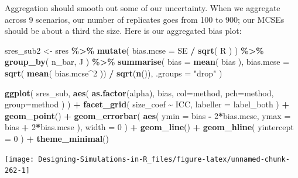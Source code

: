 \documentclass[
]{book}
\newenvironment{Shaded}{\begin{snugshade}}{\end{snugshade}}
\newcommand{\AttributeTok}[1]{\textcolor[rgb]{0.13,0.29,0.53}{#1}}
\newcommand{\DecValTok}[1]{\textcolor[rgb]{0.00,0.00,0.81}{#1}}
\newcommand{\FunctionTok}[1]{\textcolor[rgb]{0.13,0.29,0.53}{\textbf{#1}}}
\newcommand{\NormalTok}[1]{#1}
\newcommand{\OtherTok}[1]{\textcolor[rgb]{0.56,0.35,0.01}{#1}}
\newcommand{\SpecialCharTok}[1]{\textcolor[rgb]{0.81,0.36,0.00}{\textbf{#1}}}
\newcommand{\StringTok}[1]{\textcolor[rgb]{0.31,0.60,0.02}{#1}}
\begin{document}
Aggregation should smooth out some of our uncertainty.
When we aggregate across 9 scenarios, our number of replicates goes from 100 to 900; our MCSEs should be about a third the size.
Here is our aggregated bias plot:

\begin{Shaded}
\begin{Highlighting}[]
\NormalTok{sres\_sub2 }\OtherTok{\textless{}{-}} 
\NormalTok{  sres }\SpecialCharTok{\%\textgreater{}\%}
  \FunctionTok{mutate}\NormalTok{( }\AttributeTok{bias.mcse =}\NormalTok{ SE }\SpecialCharTok{/} \FunctionTok{sqrt}\NormalTok{( R ) ) }\SpecialCharTok{\%\textgreater{}\%}
  \FunctionTok{group\_by}\NormalTok{( n\_bar, J ) }\SpecialCharTok{\%\textgreater{}\%}
  \FunctionTok{summarise}\NormalTok{( }
    \AttributeTok{bias =} \FunctionTok{mean}\NormalTok{( bias ),}
    \AttributeTok{bias.mcse =} \FunctionTok{sqrt}\NormalTok{( }\FunctionTok{mean}\NormalTok{( bias.mcse}\SpecialCharTok{\^{}}\DecValTok{2}\NormalTok{ )) }\SpecialCharTok{/} \FunctionTok{sqrt}\NormalTok{(}\FunctionTok{n}\NormalTok{()),}
    \AttributeTok{.groups =} \StringTok{"drop"} 
\NormalTok{  )}

\FunctionTok{ggplot}\NormalTok{( sres\_sub, }\FunctionTok{aes}\NormalTok{( }\FunctionTok{as.factor}\NormalTok{(alpha), bias, }
                       \AttributeTok{col=}\NormalTok{method, }\AttributeTok{pch=}\NormalTok{method, }\AttributeTok{group=}\NormalTok{method ) ) }\SpecialCharTok{+}
  \FunctionTok{facet\_grid}\NormalTok{( size\_coef }\SpecialCharTok{\textasciitilde{}}\NormalTok{ ICC, }\AttributeTok{labeller =}\NormalTok{ label\_both ) }\SpecialCharTok{+}
  \FunctionTok{geom\_point}\NormalTok{() }\SpecialCharTok{+} 
  \FunctionTok{geom\_errorbar}\NormalTok{( }\FunctionTok{aes}\NormalTok{( }\AttributeTok{ymin =}\NormalTok{ bias }\SpecialCharTok{{-}} \DecValTok{2}\SpecialCharTok{*}\NormalTok{bias.mcse, }
                      \AttributeTok{ymax =}\NormalTok{ bias }\SpecialCharTok{+} \DecValTok{2}\SpecialCharTok{*}\NormalTok{bias.mcse ), }
                 \AttributeTok{width =} \DecValTok{0}\NormalTok{ ) }\SpecialCharTok{+}
  \FunctionTok{geom\_line}\NormalTok{() }\SpecialCharTok{+}
  \FunctionTok{geom\_hline}\NormalTok{( }\AttributeTok{yintercept =} \DecValTok{0}\NormalTok{ ) }\SpecialCharTok{+}
  \FunctionTok{theme\_minimal}\NormalTok{() }
\end{Highlighting}
\end{Shaded}

\begin{center}\texttt{[image: Designing-Simulations-in-R\_files/figure-latex/unnamed-chunk-262-1]} \end{center}
\end{document}
